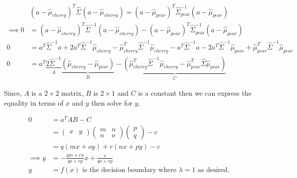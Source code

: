 \documentclass[]{article}
\begin{document}
\begin{align*}
&(a - \hat{\mu}_{cherry})^T 
\hat{\Sigma}_{\text{}}
(a - \hat{\mu}_{cherry}) = (a - \hat{\mu}_{pear})^T 
\hat{\Sigma}_{\text{pear}}^{-1} 
(a - \hat{\mu}_{pear}) 
\\
\implies 0 &= (a - \hat{\mu}_{cherry})^T 
\hat{\Sigma}_{\text{}}^{-1}
(a - \hat{\mu}_{cherry}) - (a - \hat{\mu}_{pear})^T 
\hat{\Sigma}_{\text{pear}}^{-1} 
(a - \hat{\mu}_{pear}) 
\\
0 &=a^T\hat{\Sigma}_{\text{}}^{-1}a 
+ 2a^T
\hat{\Sigma}^{-1}
\hat{\mu}_{cherry}
- \hat{\mu}_{cherry}^T
\hat{\Sigma}^{-1}
\hat{\mu}_{cherry}
- a^T
\hat{\Sigma}_{\text{}}^{-1}
a 
- 2a^T
\hat{\Sigma}^{-1}
\hat{\mu}_{pear} 
+ \hat{\mu}_{pear}^T
\hat{\Sigma}^{-1}
\hat{\mu}_{pear}
\\
0 &= a^T 
\underbrace{
2\hat{\Sigma}^{-1}}_{A} 
\underbrace{
(\hat{\mu}_{cherry} - \hat{\mu}_{pear})}_{B}
- \underbrace{(\hat{\mu}_{cherry}^T
\hat{\Sigma}^{-1}
\hat{\mu}_{cherry}
- \hat{\mu}_{pear}^T
\hat{\Sigma}
\hat{\mu}_{pear})}_{C} 
\end{align*}

Since, \(A\) is a \(2\times 2\) matrix, \(B\) is \(2\times 1\) and \(C\)
is a constant then we can express the equality in terms of \(x\) and
\(y\) then solve for \(y\).

\begin{align*}
0 &=
a^TAB - C \\
&= 
\left(
\begin{matrix}
x &y
\end{matrix}
\right)
\left(
\begin{matrix}
m &n \\ n &o
\end{matrix}
\right)
\left(
\begin{matrix}
p \\q
\end{matrix}
\right) - c \\
&= q(mx + oy) + r(nx + py) - c \\
\implies y &= -\frac{qm+rn}{qo+rp}x + \frac{c}{qo+rp} \\
y&= f(x) \text{ is the decision boundary where $\lambda=1$ as desired.}
\end{align*}
\end{document}
